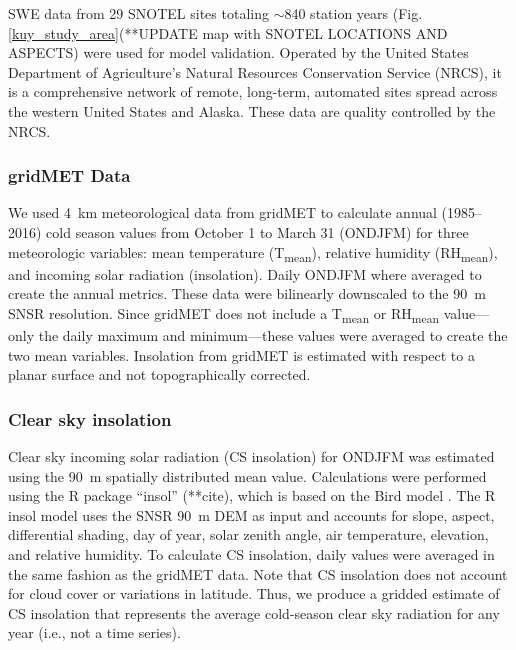 SWE data from 29 SNOTEL sites totaling $\sim$840 station years (Fig. \ref{kuy_study_area}(**UPDATE map with SNOTEL LOCATIONS AND ASPECTS) were used for model validation. Operated by the United States Department of Agriculture's Natural Resources Conservation Service (NRCS), it is a comprehensive network of remote, long-term, automated sites spread across the western United States and Alaska. These data are quality controlled by the NRCS.

\hypertarget{ch2-do-2}{\subsubsection{gridMET Data}\label{ch2-do-2}}

We used 4~km meteorological data from gridMET \citep{abatzoglouDevelopmentGriddedSurface2013} to calculate annual (1985--2016) cold season values from October 1 to March 31 (ONDJFM) for three meteorologic variables: mean temperature (T\textsubscript{mean}), relative humidity (RH\textsubscript{mean}), and incoming solar radiation (insolation). Daily ONDJFM where averaged to create the annual metrics. These data were bilinearly downscaled to the 90~m SNSR resolution. Since gridMET does not include a T\textsubscript{mean} or RH\textsubscript{mean} value---only the daily maximum and minimum---these values were averaged to create the two mean variables. Insolation from gridMET is estimated with respect to a planar surface and not topographically corrected. 

\hypertarget{ch2-do-2}{\subsubsection{Clear sky insolation}\label{ch2-do-2}}

Clear sky incoming solar radiation (CS insolation) for ONDJFM was estimated using the 90~m spatially distributed mean value. Calculations were performed using the R package “insol” (**cite), which is based on the Bird model \citep{birdReviewEvaluationImprovement1981}. The R insol model uses the SNSR 90~m DEM as input and accounts for slope, aspect, differential shading, day of year, solar zenith angle, air temperature, elevation, and relative humidity. To calculate CS insolation, daily values were averaged in the same fashion as the gridMET data. Note that CS insolation does not account for cloud cover or variations in latitude. Thus, we produce a gridded estimate of CS insolation that represents the average cold-season clear sky radiation for any year (i.e., not a time series).

